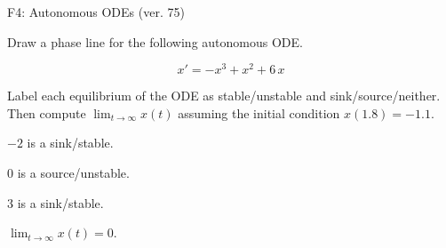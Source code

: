 \begin{exercise}
  \begin{exerciseTitle}F4: Autonomous ODEs (ver. 75)\end{exerciseTitle}
  \begin{exerciseStatement}
    

      Draw a phase line for the following 
      autonomous ODE.
    

    
\[x'= -x^{3} + x^{2} + 6 \, x\]

    

      Label each equilibrium of the ODE
      as stable/unstable and sink/source/neither.
      Then compute \(\lim_{t\to\infty}x(t)\)
      assuming the initial condition
      \(x( 1.8 )= -1.1\).
    

  \end{exerciseStatement}
  \begin{exerciseAnswer}
    

      \(-2\) is a sink/stable.
      
        \(0\) is a source/unstable.
      
      \(3\) is a sink/stable.
    

    

      \(\lim_{t\to\infty}x(t)=0\).
    

  \end{exerciseAnswer}
\end{exercise}